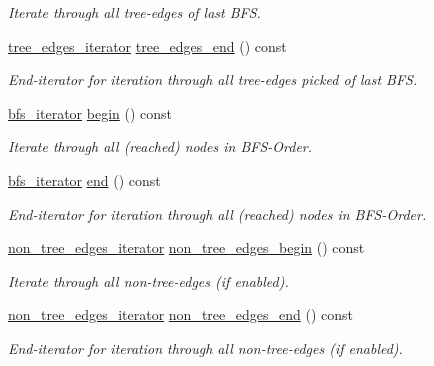 \begin{DoxyCompactItemize}
\begin{DoxyCompactList}\small\item\em Iterate through all tree-\/edges of last B\+FS. \end{DoxyCompactList}\item 
\mbox{\hyperlink{classbfs_a04e608fe18089e5495cadb995aa75261}{tree\+\_\+edges\+\_\+iterator}} \mbox{\hyperlink{classbfs_a7db47d5d68e21e95fd548beea1a8db2b}{tree\+\_\+edges\+\_\+end}} () const
\begin{DoxyCompactList}\small\item\em End-\/iterator for iteration through all tree-\/edges picked of last B\+FS. \end{DoxyCompactList}\item 
\mbox{\hyperlink{classbfs_a1035f068a96de0370789ec315aef4f73}{bfs\+\_\+iterator}} \mbox{\hyperlink{classbfs_aff214e6d33f7f2bbd899cf335540def9}{begin}} () const
\begin{DoxyCompactList}\small\item\em Iterate through all (reached) nodes in B\+F\+S-\/\+Order. \end{DoxyCompactList}\item 
\mbox{\hyperlink{classbfs_a1035f068a96de0370789ec315aef4f73}{bfs\+\_\+iterator}} \mbox{\hyperlink{classbfs_ac35b3d3c37d33eb80adb752e17a60df9}{end}} () const
\begin{DoxyCompactList}\small\item\em End-\/iterator for iteration through all (reached) nodes in B\+F\+S-\/\+Order. \end{DoxyCompactList}\item 
\mbox{\hyperlink{classbfs_a89ec32919076618d9eef18990fef543f}{non\+\_\+tree\+\_\+edges\+\_\+iterator}} \mbox{\hyperlink{classbfs_a06d02d2643f184b4c086678771f0ff90}{non\+\_\+tree\+\_\+edges\+\_\+begin}} () const
\begin{DoxyCompactList}\small\item\em Iterate through all non-\/tree-\/edges (if enabled). \end{DoxyCompactList}\item 
\mbox{\hyperlink{classbfs_a89ec32919076618d9eef18990fef543f}{non\+\_\+tree\+\_\+edges\+\_\+iterator}} \mbox{\hyperlink{classbfs_a9fb470cd36eb487004ca28c1723cabda}{non\+\_\+tree\+\_\+edges\+\_\+end}} () const
\begin{DoxyCompactList}\small\item\em End-\/iterator for iteration through all non-\/tree-\/edges (if enabled). \end{DoxyCompactList}\item 

\end{DoxyCompactItemize}
